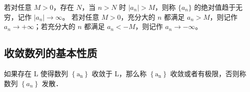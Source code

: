 \documentclass[fontset=fandol]{ctexart}
\newenvironment{custom}[1]{\par\noindent\textbf{#1}\quad}{\par\vspace{0.8em}}
\newenvironment{remark}{\par\noindent\textbf{注}\quad}{\par\vspace{0.8em}}
\begin{document}
\begin{definition}[无穷大量]
	若对任意 \(M>0\)，存在 \(N\)，当 \(n>N\) 时 \(|a_n|>M\)，则称 \(\{a_n\}\) 的绝对值趋于无穷，记作 \(|a_n|\to\infty\)。
	若对任意 \(M>0\)，充分大的 \(n\) 都满足 \(a_n>M\)，则记作 \(a_n\to+\infty\)；若充分大的 \(n\) 都满足 \(a_n<-M\)，则记作 \(a_n\to-\infty\)。
\end{definition}

\subsection{收敛数列的基本性质}

\begin{proposition}[数列的收敛与发散]
如果存在 L 使得数列 $\left\{\mathrm{a}_{\mathrm{n}}\right\}$ 收敛于 L，那么称 $\left\{\mathrm{a}_{\mathrm{n}}\right\}$ 收敛或者有极限，否则称数列 $\left\{a_n\right\}$ 发散．
	
\end{proposition}
\end{document}
